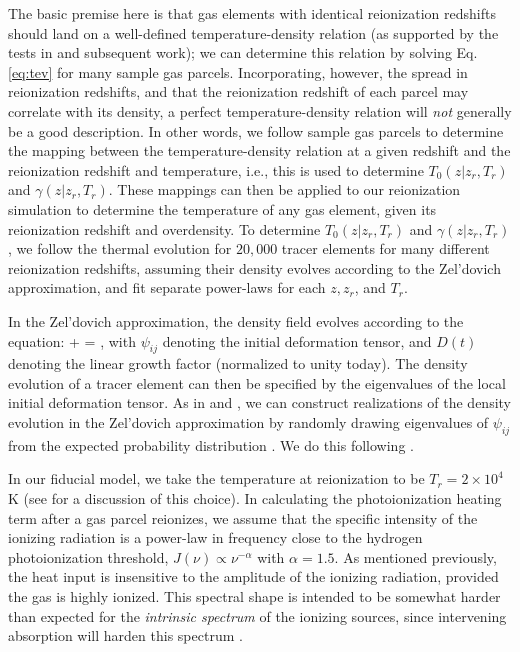 The basic premise here is that gas elements with identical reionization redshifts should land on a well-defined temperature-density
relation (as supported by the tests in \citealt{Hui:1997dp} and subsequent work); we can determine this relation by solving Eq. \ref{eq:tev} for many sample gas parcels.
Incorporating, however, the spread in reionization redshifts, and that the reionization redshift of each parcel may
correlate with its density, a perfect temperature-density relation will {\em not} generally be a good description. In other words,
we follow sample gas parcels to determine the mapping between the temperature-density relation at a given redshift and
the reionization redshift and temperature, i.e., this is used to determine $T_0(z|z_r,T_r)$ and $\gamma(z|z_r, T_r)$. These
mappings can then be applied to our reionization simulation to determine the temperature of any gas element, given its
reionization redshift and overdensity. To determine $T_0(z|z_r,T_r)$ and $\gamma(z|z_r,T_r)$, we follow the thermal evolution for $20,000$ tracer elements
for many different
reionization redshifts, assuming their density evolves according to the Zel'dovich approximation, and fit separate power-laws
for each $z, z_r$, and $T_r$. 

In the Zel'dovich approximation, the density field evolves according to the equation:
 + \delta = ,
\label{eq:zeldo}
\eeqa
with $\psi_{ij}$ denoting the initial deformation tensor, and $D(t)$ denoting the linear growth factor (normalized to unity today). The density evolution of a tracer element can then be specified by the eigenvalues of the local initial deformation 
tensor.  
As in \citet{Hui:1997dp} and \citet{1995ApJ...449..476R}, we can construct realizations of the density evolution in the Zel'dovich approximation 
by randomly drawing eigenvalues of $\psi_{ij}$ from the expected probability distribution \citep{1970Afz.....6..581D}. We do this following \citet{Hui:1999ku,Bertschinger:1993zv}. 


In our fiducial model, we take the temperature at reionization to be $T_r = 2 \times 10^4$ K (see \citealt{Furlanetto:2009kr,McQuinn:2012bq} for a discussion
of this choice). In calculating the photoionization heating term after a gas parcel reionizes, we assume that the specific
intensity of the ionizing radiation 
is a power-law in frequency close to the hydrogen photoionization threshold, $J(\nu) \propto \nu^{-\alpha}$ with $\alpha=1.5$.
As mentioned previously, the heat input is insensitive to the amplitude of the ionizing radiation, provided the gas is highly ionized. This spectral shape is intended
to be somewhat harder than expected for the {\em intrinsic spectrum} of the ionizing sources, since intervening absorption will harden
this spectrum \citep{1993ApJ...418...28Z,Hui:2003hn,Furlanetto:2009kr}.


